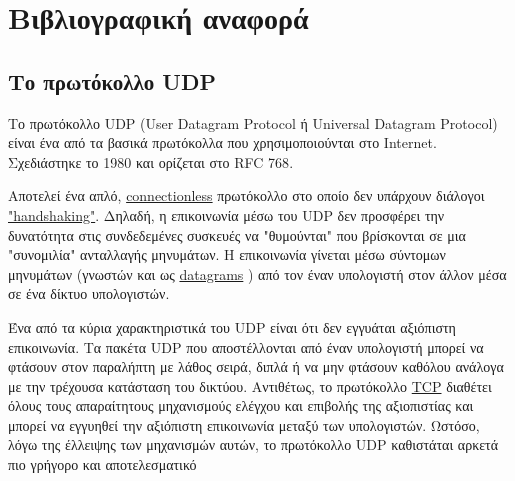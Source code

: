 \chapter{Βιβλιογραφική αναφορά}
\section{Το πρωτόκολλο UDP}
Το πρωτόκολλο UDP (User Datagram Protocol ή Universal Datagram Protocol)
είναι ένα από τα βασικά πρωτόκολλα που χρησιμοποιούνται στο Internet.
Σχεδιάστηκε το 1980 και ορίζεται στο RFC 768\cite{rfc768}\cite{wiki:udp}.

Αποτελεί ένα απλό,
\href{https://en.wikipedia.org/wiki/Connectionless_communication}{connectionless}
πρωτόκολλο στο οποίο δεν υπάρχουν διάλογοι
\href{https://en.wikipedia.org/wiki/Handshaking}{"handshaking"}.
Δηλαδή, η επικοινωνία μέσω του UDP δεν προσφέρει την δυνατότητα στις συνδεδεμένες συσκευές να "θυμούνται" που βρίσκονται σε μια "συνομιλία" ανταλλαγής μηνυμάτων.
Η επικοινωνία γίνεται μέσω σύντομων μηνυμάτων (γνωστών και ως
\href{https://en.wikipedia.org/wiki/Datagram}{datagrams}
) από τον έναν υπολογιστή στον άλλον μέσα σε ένα δίκτυο υπολογιστών.

Ένα από τα κύρια χαρακτηριστικά του UDP είναι ότι δεν εγγυάται αξιόπιστη επικοινωνία.
Τα πακέτα UDP που αποστέλλονται από έναν υπολογιστή μπορεί να φτάσουν στον παραλήπτη με λάθος σειρά, διπλά ή να μην φτάσουν καθόλου ανάλογα με την τρέχουσα κατάσταση του δικτύου.
Αντιθέτως, το πρωτόκολλο
\href{https://en.wikipedia.org/wiki/Transmission_Control_Protocol}{TCP}
διαθέτει όλους τους απαραίτητους μηχανισμούς ελέγχου και επιβολής της αξιοπιστίας και μπορεί να εγγυηθεί την αξιόπιστη επικοινωνία μεταξύ των υπολογιστών.
Ωστόσο, λόγω της έλλειψης των μηχανισμών αυτών, το πρωτόκολλο UDP καθιστάται αρκετά πιο γρήγορο και αποτελεσματικό
